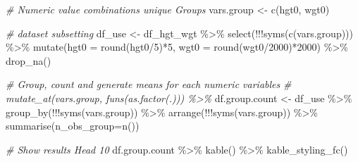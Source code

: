 \documentclass[
]{book}
\newenvironment{Shaded}{\begin{snugshade}}{\end{snugshade}}
\newcommand{\AttributeTok}[1]{\textcolor[rgb]{0.77,0.63,0.00}{#1}}
\newcommand{\CommentTok}[1]{\textcolor[rgb]{0.56,0.35,0.01}{\textit{#1}}}
\newcommand{\DecValTok}[1]{\textcolor[rgb]{0.00,0.00,0.81}{#1}}
\newcommand{\FunctionTok}[1]{\textcolor[rgb]{0.00,0.00,0.00}{#1}}
\newcommand{\NormalTok}[1]{#1}
\newcommand{\OtherTok}[1]{\textcolor[rgb]{0.56,0.35,0.01}{#1}}
\newcommand{\SpecialCharTok}[1]{\textcolor[rgb]{0.00,0.00,0.00}{#1}}
\newcommand{\StringTok}[1]{\textcolor[rgb]{0.31,0.60,0.02}{#1}}
\begin{document}
\begin{Shaded}
\begin{Highlighting}[]
\CommentTok{\# Numeric value combinations unique Groups}
\NormalTok{vars.group }\OtherTok{\textless{}{-}} \FunctionTok{c}\NormalTok{(}\StringTok{\textquotesingle{}hgt0\textquotesingle{}}\NormalTok{, }\StringTok{\textquotesingle{}wgt0\textquotesingle{}}\NormalTok{)}

\CommentTok{\# dataset subsetting}
\NormalTok{df\_use }\OtherTok{\textless{}{-}}\NormalTok{ df\_hgt\_wgt }\SpecialCharTok{\%\textgreater{}\%} \FunctionTok{select}\NormalTok{(}\SpecialCharTok{!!!}\FunctionTok{syms}\NormalTok{(}\FunctionTok{c}\NormalTok{(vars.group))) }\SpecialCharTok{\%\textgreater{}\%}
            \FunctionTok{mutate}\NormalTok{(}\AttributeTok{hgt0 =} \FunctionTok{round}\NormalTok{(hgt0}\SpecialCharTok{/}\DecValTok{5}\NormalTok{)}\SpecialCharTok{*}\DecValTok{5}\NormalTok{, }\AttributeTok{wgt0 =} \FunctionTok{round}\NormalTok{(wgt0}\SpecialCharTok{/}\DecValTok{2000}\NormalTok{)}\SpecialCharTok{*}\DecValTok{2000}\NormalTok{) }\SpecialCharTok{\%\textgreater{}\%}
            \FunctionTok{drop\_na}\NormalTok{()}

\CommentTok{\# Group, count and generate means for each numeric variables}
\CommentTok{\# mutate\_at(vars.group, funs(as.factor(.))) \%\textgreater{}\%}
\NormalTok{df.group.count }\OtherTok{\textless{}{-}}\NormalTok{ df\_use }\SpecialCharTok{\%\textgreater{}\%} \FunctionTok{group\_by}\NormalTok{(}\SpecialCharTok{!!!}\FunctionTok{syms}\NormalTok{(vars.group)) }\SpecialCharTok{\%\textgreater{}\%}
                    \FunctionTok{arrange}\NormalTok{(}\SpecialCharTok{!!!}\FunctionTok{syms}\NormalTok{(vars.group)) }\SpecialCharTok{\%\textgreater{}\%}
                    \FunctionTok{summarise}\NormalTok{(}\AttributeTok{n\_obs\_group=}\FunctionTok{n}\NormalTok{())}

\CommentTok{\# Show results Head 10}
\NormalTok{df.group.count }\SpecialCharTok{\%\textgreater{}\%} \FunctionTok{kable}\NormalTok{() }\SpecialCharTok{\%\textgreater{}\%} \FunctionTok{kable\_styling\_fc}\NormalTok{()}
\end{Highlighting}
\end{Shaded}
\end{document}

